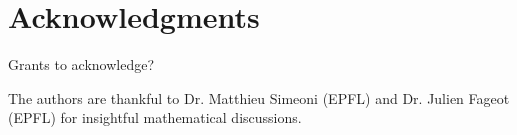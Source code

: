\section*{Acknowledgments}

Grants to acknowledge? 
 

The authors are thankful to Dr. Matthieu Simeoni (EPFL) and Dr. Julien Fageot (EPFL) for insightful mathematical discussions.
